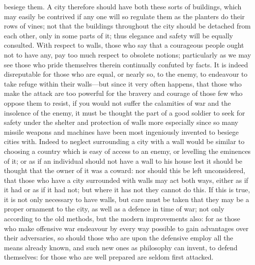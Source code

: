 besiege them. A city therefore should have both these sorts of buildings,
which may easily be contrived if any one will so regulate them as the
planters do their rows of vines; not that the buildings throughout the
city should be detached from each other, only in some parts of it; thus
elegance and safety will be equally consulted. With respect to walls,
those who say that a courageous people ought not to have any, pay too much
respect to obsolete notions; particularly as we may see those who pride
themselves therein continually confuted by facts. It is indeed
disreputable for those who are equal, or nearly so, to the enemy, to
endeavour to take refuge within their walls—but since it very often
happens, that those who make the attack are too powerful for the bravery
and courage of those few who oppose them to resist, if you would not
suffer the calamities of war and the insolence of the enemy, it must be
thought the part of a good soldier to seek for safety under the shelter
and protection of walls more especially since so many missile weapons and
machines have been most ingeniously invented to besiege cities with.
Indeed to neglect surrounding a city with a wall would be similar to
choosing a country which is easy of access to an enemy, or levelling the
eminences of it; or as if an individual should not have a wall to his
house lest it should be thought that the owner of it was a coward: nor
should this be left unconsidered, that those who have a city surrounded
with walls may act both ways, either as if it had or as if it had not; but
where it has not they cannot do this. If this is true, it is not only
necessary to have walls, but care must be taken that they may be a proper
ornament to the city, as well as a defence in time of war; not only
according to the old methods, but the modern improvements also: for as
those who make offensive war endeavour by every way possible to gain
advantages over their adversaries, so should those who are upon the
defensive employ all the means already known, and such new ones as
philosophy can invent, to defend themselves: for those who are well
prepared are seldom first attacked.


